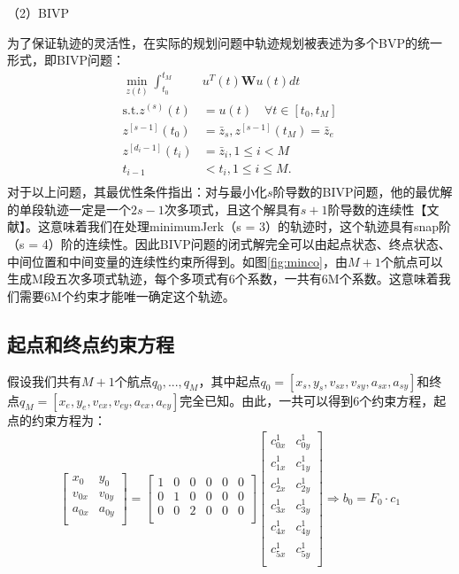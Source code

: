 \documentclass[master,academic]{ysuthesis} %
\begin{document}
		（2）BIVP 
		
		为了保证轨迹的灵活性，在实际的规划问题中轨迹规划被表述为多个BVP的统一形式，即BIVP问题：
		\begin{equation}
			\begin{aligned}
				\min_{z(t)}\int_{t_0}^{t_M}&u^T(t)\mathbf{W}u(t)dt\\
				\text{s.t}.z^{( s )}(t) &=u(t) \quad \forall t\in \left[ t_0,t_M \right]\\
				z^{\left[ s-1 \right]}( t_0 ) &=\bar{z}_s,z^{\left[ s-1 \right]}( t_M ) =\bar{z}_e\\
				z^{\left[ d_i-1 \right]}( t_i ) &=\bar{z}_i,1\leq i<M\\
				t_{i-1}&<t_i,1\leq i\leq M.\\
			\end{aligned}
		\end{equation}
		对于以上问题，其最优性条件指出：对与最小化$s$阶导数的BIVP问题，他的最优解的单段轨迹一定是一个$2s-1$次多项式，且这个解具有$s+1$阶导数的连续性【文献】。这意味着我们在处理minimumJerk（s = 3）的轨迹时，这个轨迹具有snap阶（s = 4）阶的连续性。因此BIVP问题的闭式解完全可以由起点状态、终点状态、中间位置和中间变量的连续性约束所得到。如图\ref{fig:minco}，由$M+1$个航点可以生成M段五次多项式轨迹，每个多项式有6个系数，一共有6M个系数。这意味着我们需要6M个约束才能唯一确定这个轨迹。
	
		\subsection{起点和终点约束方程} 
		假设我们共有$M+1$个航点$q_0,...,q_M$，其中起点$q_0=[x_s,y_s,v_{sx},v_{sy},a_{sx},a_{sy}]$和终点$q_M=[x_e,y_e,v_{ex},v_{ey},a_{ex},a_{ey}]$完全已知。由此，一共可以得到6个约束方程，起点的约束方程为：
		\begin{equation}
			\begin{aligned}
			\begin{bmatrix}
				x_0&		y_0\\
				v_{0x}&		v_{0y}\\
				a_{0x}&		a_{0y}\\
			\end{bmatrix} =\begin{bmatrix}
				1&		0&		0&		0&		0&		0\\
				0&		1&		0&		0&		0&		0\\
				0&		0&		2&		0&		0&		0\\
			\end{bmatrix} \begin{bmatrix}
				c_{0x}^{1}&		c_{0y}^{1}\\
				c_{1x}^{1}&		c_{1y}^{1}\\
				c_{2x}^{1}&		c_{2y}^{1}\\
				c_{3x}^{1}&		c_{3y}^{1}\\
				c_{4x}^{1}&		c_{4y}^{1}\\
				c_{5x}^{1}&		c_{5y}^{1}\\
			\end{bmatrix} \Longrightarrow b_0=F_0\cdot c_1
			\end{aligned}
		\end{equation}
\end{document}
